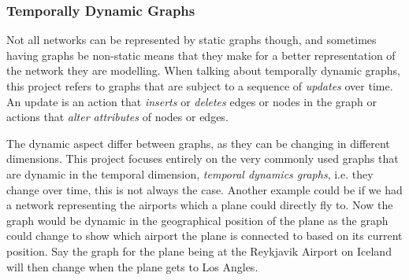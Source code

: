 \subsubsection{Temporally Dynamic Graphs}
\label{sec:Method:Graphs:DynamicGraphs}
Not all networks can be represented by static graphs though, and sometimes having graphs be non-static means that they make for a better representation of the network they are modelling. 
When talking about temporally dynamic graphs, this project refers to graphs that are subject to a sequence of \textit{updates} over time. 
An update is an action that \textit{inserts} or \textit{deletes} edges or nodes in the graph or actions that \textit{alter attributes} of nodes or edges.


The dynamic aspect differ between graphs, as they can be changing in different dimensions. 
This project focuses entirely on the very commonly used graphs that are dynamic in the temporal dimension, \textit{temporal dynamics graphs}, i.e. they change over time, this is not always the case. 
Another example could be if we had a network representing the airports which a plane could directly fly to. 
Now the graph would be dynamic in the geographical position of the plane as the graph could change to show which airport the plane is connected to based on its current position. 
Say the graph for the plane being at the Reykjavik Airport on Iceland will then change when the plane gets to Los Angles.










